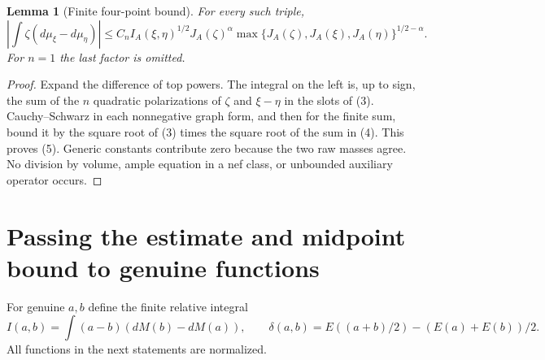 \documentclass[11pt]{article}
\newtheorem{lemma}[theorem]{Lemma}
\begin{document}
\begin{lemma}[Finite four-point bound]\label{finite}
For every such triple,
\[
 \left|\int\zeta(d\mu_\xi-d\mu_\eta)\right|
 \leq C_n I_A(\xi,\eta)^{1/2}J_A(\zeta)^\alpha
       \max\{J_A(\zeta),J_A(\xi),J_A(\eta)\}^{1/2-\alpha}.
                                                        \tag{5}
\]
For $n=1$ the last factor is omitted.
\end{lemma}
\begin{proof}
Expand the difference of top powers. The integral on the left is,
up to sign, the sum of the $n$ quadratic polarizations of $\zeta$
and $\xi-\eta$ in the slots of (3).
Cauchy--Schwarz in each nonnegative graph form, and then for the
finite sum, bound it by the square root of (3) times the square
root of the sum in (4). This proves (5).
Generic constants contribute zero because the two raw masses agree.
No division by volume, ample equation in a nef class, or unbounded
auxiliary operator occurs.
\end{proof}

\section{Passing the estimate and midpoint bound to genuine functions}
For genuine $a,b$ define the finite relative integral
\[
 I(a,b)=\int(a-b)(dM(b)-dM(a)),\qquad
 \delta(a,b)=E((a+b)/2)-(E(a)+E(b))/2.
\]
All functions in the next statements are normalized.
\end{document}
